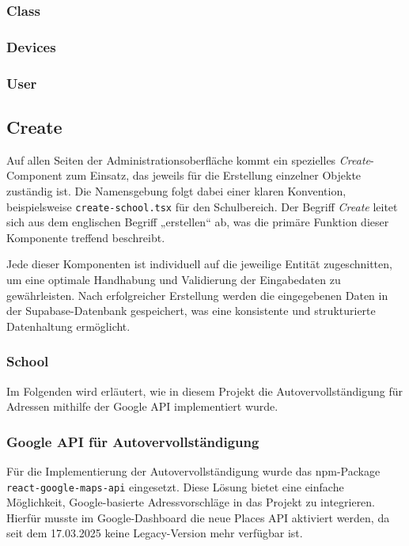 \begin{inhalt}
\subsubsection{Class}

\subsubsection{Devices}

\subsubsection{User}

\subsection{Create}

Auf allen Seiten der Administrationsoberfläche kommt ein spezielles \emph{Create}-Component zum Einsatz, das jeweils für die Erstellung einzelner Objekte zuständig ist. Die Namensgebung folgt dabei einer klaren Konvention, beispielsweise \texttt{create-school.tsx} für den Schulbereich. Der Begriff \emph{Create} leitet sich aus dem englischen Begriff „erstellen“ ab, was die primäre Funktion dieser Komponente treffend beschreibt.

Jede dieser Komponenten ist individuell auf die jeweilige Entität zugeschnitten, um eine optimale Handhabung und Validierung der Eingabedaten zu gewährleisten. Nach erfolgreicher Erstellung werden die eingegebenen Daten in der Supabase-Datenbank gespeichert, was eine konsistente und strukturierte Datenhaltung ermöglicht.

\subsubsection{School}






Im Folgenden wird erläutert, wie in diesem Projekt die Autovervollständigung für Adressen mithilfe der Google API implementiert wurde.

\subsubsection{Google API für Autovervollständigung}

Für die Implementierung der Autovervollständigung wurde das npm-Package \texttt{react-google-maps-api} eingesetzt. Diese Lösung bietet eine einfache Möglichkeit, Google-basierte Adressvorschläge in das Projekt zu integrieren. Hierfür musste im Google-Dashboard die neue Places API aktiviert werden, da seit dem 17.03.2025 keine Legacy-Version mehr verfügbar ist.


\end{inhalt}
